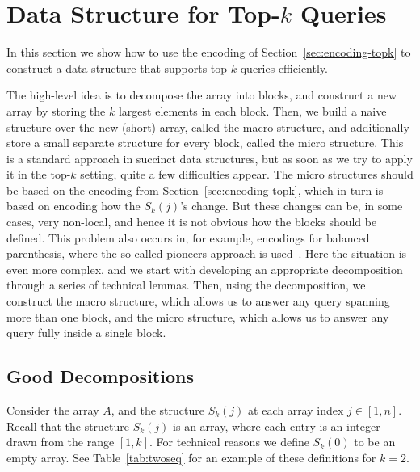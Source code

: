 \documentclass[runningheads]{llncs}
\begin{document}
\section{\label{sec:datastructure}Data Structure for Top-\texorpdfstring{$k$}{k} Queries}

In this section we show how to use the encoding of
Section~\ref{sec:encoding-topk} to construct a data structure that
supports top-$k$ queries efficiently.

The high-level idea is to decompose the array into blocks, and
construct a new array by storing the $k$ largest elements in each
block.  Then, we build a naive structure over the new (short) array,
called the macro structure, and additionally store a small separate
structure for every block, called the micro structure. This is a
standard approach in succinct data structures, but as soon as we try
to apply it in the top-$k$ setting, quite a few difficulties
appear. The micro structures should be based on the encoding from
Section~\ref{sec:encoding-topk}, which in turn is based on encoding
how the $S_k(j)$'s change. But these changes can be, in some cases,
very non-local, and hence it is not obvious how the blocks should be
defined. This problem also occurs in, for example, encodings for
balanced parenthesis, where the so-called pioneers approach is
used~\cite{GRRR06}.  Here the situation is even more complex, and we
start with developing an appropriate decomposition through a series of
technical lemmas.  Then, using the decomposition, we construct the
macro structure, which allows us to answer any query spanning more
than one block, and the micro structure, which allows us to answer any
query fully inside a single block.

\subsection{Good Decompositions}

Consider the array $A$, and the structure $S_k(j)$ at each array index
$j \in [1,n]$.  Recall that the structure $S_k(j)$ is an array, where
each entry is an integer drawn from the range $[1,k]$.  For technical
reasons we define $S_k(0)$ to be an empty array.  See
Table~\ref{tab:twoseq} for an example of these definitions for $k =
2$.
\end{document}
